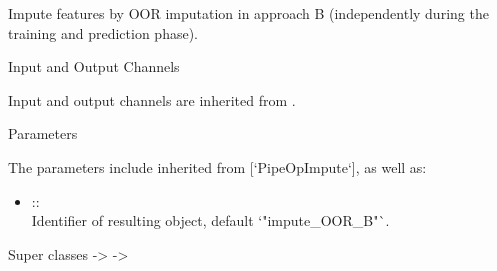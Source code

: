 \documentclass[letterpaper]{book}
\begin{document}
%
\begin{Description}\relax
Impute features by OOR imputation in approach B (independently during the training and prediction phase).
\end{Description}
%
\begin{Section}{Input and Output Channels}

Input and output channels are inherited from .
\end{Section}
%
\begin{Section}{Parameters}

The parameters include inherited from [`PipeOpImpute`], as well as: \\{}
\begin{itemize}

\item{}  :: \\{}
Identifier of resulting object, default `"impute\_OOR\_B"`.

\end{itemize}

\end{Section}
%
\begin{Section}{Super classes}
 ->  -> 
\end{Section}
%
\end{document}

